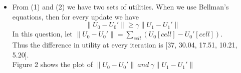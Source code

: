 \documentclass[letter, 10pt]{article}
\begin{document}
\begin{itemize}
\begin{equation*}
\begin{tabular}{ |c|c|c| }
                                    \end{tabular}
                \end{equation*}
                \begin{equation*}
                    Num\_Iterations = 4
                \end{equation*}
    \item[(3)] From (1) and (2) we have two sets of utilities. When we use Bellman's equations, then for every update we have
    \begin{equation}
        \left\|U_0-U_0'\right\|\geq\gamma\left\|U_1-U_1'\right\|
    \end{equation}
    In this question, let $\left\|U_0-U_0'\right\| = \sum_{cell}(U_0[cell]-U_0'[cell])$.\\
    Thus the difference in utility at every iteration is [37, 30.04, 17.51, 10.21, 5.20].\\
    Figure 2 shows the plot of $\left\|U_0-U_0'\right\|\ and \ \gamma\left\|U_1-U_1'\right\|$
\end{itemize}
\end{document}
